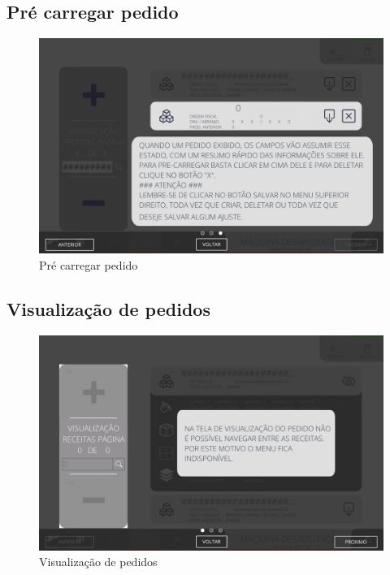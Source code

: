 \newpage
\thispagestyle{fancy}
\vspace*{40 pt}
\subsection{\small Pré carregar pedido}
\vspace*{\fill}
\begin{figure}[h]
    \centering
    \includegraphics[width=576 px,height=360 px]{src/imagesICV/09-request/visualization/e-3.png}
    \caption{Pré carregar pedido}
\end{figure}
\vspace*{\fill}

\newpage
\thispagestyle{fancy}
\vspace*{40 pt}
\subsection{\small Visualização de pedidos}
\vspace*{\fill}
\begin{figure}[h]
    \centering
    \includegraphics[width=576 px,height=360 px]{src/imagesICV/09-request/visualization/e-4.png}
    \caption{Visualização de pedidos}
\end{figure}
\vspace*{\fill}

